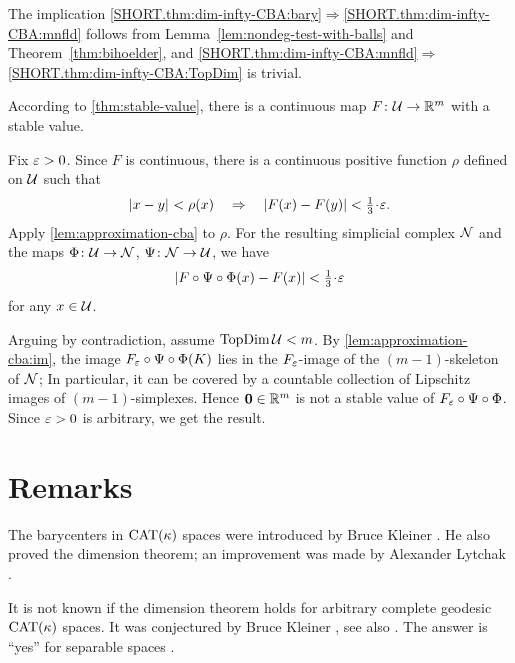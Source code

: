 The implication \ref{SHORT.thm:dim-infty-CBA:bary}$\Rightarrow$\ref{SHORT.thm:dim-infty-CBA:mnfld} follows from Lemma~\ref{lem:nondeg-test-with-balls}
and Theorem~\ref{thm:bihoelder}, and \ref{SHORT.thm:dim-infty-CBA:mnfld}$\Rightarrow$\ref{SHORT.thm:dim-infty-CBA:TopDim} is trivial.
 
According to \ref{thm:stable-value}, 
there is a continuous map $F\colon\mathcal{U}\to \mathbb{R}^{m}$ with a stable value.

Fix $\varepsilon>0$.
Since $F$ is continuous, there is a continuous positive function $\rho$ defined on $\mathcal{U}$ such that 
\[\dist{x}{y}{}<\rho(x)
\quad\Rightarrow\quad
|F(x)- F(y)|<\tfrac13\cdot\eps.\]
Apply \ref{lem:approximation-cba} to $\rho$.
For the resulting simplicial complex $\mathcal{N}$ 
 and the maps $\Phi\colon\mathcal{U}\to \mathcal{N}$, $\Psi\colon\mathcal{N}\to \mathcal{U}$, we have
\[|F\circ \Psi\circ\map(x)-F(x)|<\tfrac13\cdot\eps\] 
for any $x\in \mathcal{U}$.

Arguing by contradiction,
assume $\mathop{\rm TopDim}\nolimits\mathcal{U}<m$.
By \ref{lem:approximation-cba:im},
the image $F_\varepsilon\circ\Psi\circ\Phi(K)$ lies in the $F_\varepsilon$-image of the $(m-1)$-skeleton of $\mathcal{N}$;
In particular, it can be covered by a countable collection of Lipschitz images of $(m-1)$-simplexes.
Hence
$\bm{0}\in \mathbb{R}^m$ is not a stable value of  $F_\varepsilon\circ\Psi\circ\Phi$.
Since $\varepsilon>0$ is arbitrary, we get the result.
\qeds

\section{Remarks}

The barycenters in $\mathrm{CAT}(\kappa)$ spaces were introduced by Bruce Kleiner \cite{kleiner}.
He also proved the dimension theorem; an improvement was made by Alexander Lytchak \cite{lytchak:diff}.

It is not known if the dimension theorem holds for arbitrary complete geodesic $\mathrm{CAT}(\kappa)$ spaces.
It was conjectured by Bruce Kleiner \cite{kleiner}, see also \cite[p.~133]{gromov:asymt-inv}.
The answer is ``yes'' for separable spaces \cite[Corollary 14.13]{alexander-kapovitch-petrunin-2025}.

